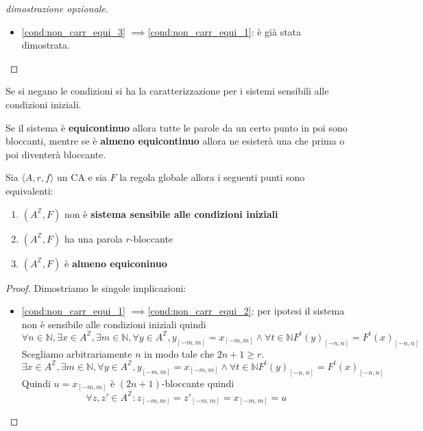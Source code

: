 \begin{teorema}
\begin{proof}[dimostrazione opzionale]
\begin{itemize}
            \item \ref{cond:non_carr_equi_3} $\implies $\ref{cond:non_carr_equi_1}: 
            è già stata dimostrata.
        \end{itemize}
    \end{proof}
\end{teorema}
Se si negano le condizioni si ha la caratterizzazione per i sistemi sensibili
alle condizioni iniziali.

\begin{nota}
    Se il sistema è \textbf{equicontinuo} allora tutte le parole da un certo punto 
    in poi sono bloccanti, mentre se è \textbf{almeno equicontinuo} allora ne esisterà
    una che prima o poi diventerà bloccante.
\end{nota}

\begin{teorema}
    Sia $\langle A,r,f\rangle$ un CA e sia $F$ la regola globale allora i seguenti
    punti sono equivalenti:
    \begin{enumerate}
        \item \label{cond:non_carr_a_equi_1} $(A^\mathbb{Z}, F)$ non è \textbf{sistema 
        sensibile alle condizioni iniziali}
        \item \label{cond:non_carr_a_equi_2} $(A^\mathbb{Z}, F)$ ha una parola $r$-bloccante
        \item \label{cond:non_carr_a_equi_3} $(A^\mathbb{Z}, F)$ è \textbf{almeno equiconinuo}
    \end{enumerate}
    \begin{proof}
        Dimostriamo le singole implicazioni:
        \begin{itemize}
            \item \ref{cond:non_carr_equi_1} $\implies $\ref{cond:non_carr_equi_2}:
            per ipotesi il sistema non è sensibile alle condizioni iniziali quindi
            $$\forall n\in \mathbb{N} ,\exists x \in A^\mathbb{Z}, \exists m\in \mathbb{N} , \forall y\in A^\mathbb{Z}, y_{[-m,m]} = x_{[-m,m]} \land \forall t\in \mathbb{N} F^t(y)_{[-n,n]}= F^t(x)_{[-n,n]}$$
            Scegliamo arbitrariamente $n$ in modo tale che $2n+1\ge r$.
            $$\exists x \in A^\mathbb{Z}, \exists m\in \mathbb{N} , \forall y\in A^\mathbb{Z}, y_{[-m,m]} = x_{[-m,m]} \land \forall t\in \mathbb{N} F^t(y)_{[-n,n]}= F^t(x)_{[-n,n]}$$
            Quindi $u=x_{[-m,m]}$ è $(2n+1)$-bloccante quindi
            $$\forall z,z'\in A^\mathbb{Z}: z_{[-m,m]}=z'_{[-m,m]} = x_{[-m,m]} =u$$

\end{itemize}
\end{proof}
\end{teorema}
